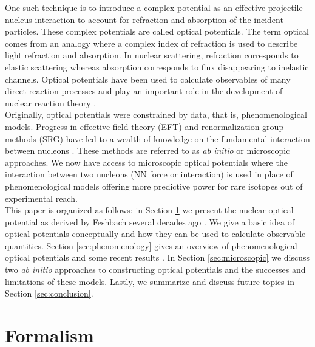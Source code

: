 \documentclass[preprintnumbers,floatfix,aps,prc,preprint,nofootinbib]{revtex4-1}
\begin{document}
One such technique is to introduce a complex potential as an effective projectile-nucleus interaction to account for refraction and absorption of the incident particles. These complex potentials are called optical potentials. The term optical comes from an analogy where a complex index of refraction is used to describe light refraction and absorption. In nuclear scattering, refraction corresponds to elastic scattering whereas absorption corresponds to flux disappearing to inelastic channels. Optical potentials have been used to calculate observables of many direct reaction processes and play an important role in the development of nuclear reaction theory \cite{thompson_nunes_2009}.
\\

Originally, optical potentials were constrained by data, that is, phenomenological models. Progress in effective field theory (EFT) and renormalization group methods (SRG) have led to a wealth of knowledge on the fundamental interaction between nucleons \cite{Epelbaum:2008ga}. These methods are referred to as \textit{ab initio} or microscopic approaches. We now have access to microscopic optical potentials where the interaction between two nucleons (NN force or interaction) is used in place of phenomenological models offering more predictive power for rare isotopes out of experimental reach.
\\

This paper is organized as follows: in Section \ref{sec:formalism} we present the nuclear optical potential as derived by Feshbach several decades ago \cite{Feshbach:1958nx, Feshbach:1962ut}. We give a basic idea of optical potentials conceptually and how they can be used to calculate observable quantities. Section \ref{sec:phenomenology} gives an overview of phenomenological optical potentials and some recent results \cite{Koning:2003zz}. In Section \ref{sec:microscopic} we discuss two \textit{ab initio} approaches to constructing optical potentials and the successes and limitations of these models. Lastly, we summarize and discuss future topics in Section \ref{sec:conclusion}.


\section{Formalism}
\label{sec:formalism}
\end{document}
